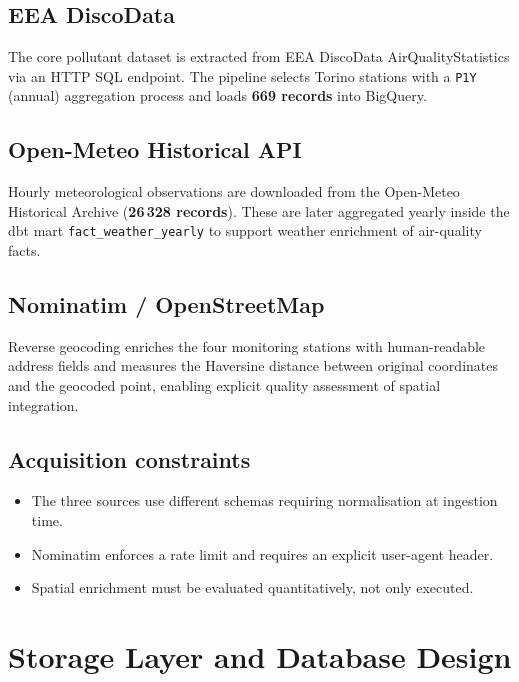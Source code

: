 \documentclass[11pt,a4paper]{article}
\begin{document}
\subsection{EEA DiscoData}

The core pollutant dataset is extracted from EEA DiscoData AirQualityStatistics via an HTTP SQL
endpoint. The pipeline selects Torino stations with a \texttt{P1Y} (annual) aggregation process
and loads \textbf{669 records} into BigQuery.

\subsection{Open-Meteo Historical API}

Hourly meteorological observations are downloaded from the Open-Meteo Historical Archive
(\textbf{26\,328 records}). These are later aggregated yearly inside the dbt mart
\texttt{fact\_weather\_yearly} to support weather enrichment of air-quality facts.

\subsection{Nominatim / OpenStreetMap}

Reverse geocoding enriches the four monitoring stations with human-readable address fields and
measures the Haversine distance between original coordinates and the geocoded point, enabling
explicit quality assessment of spatial integration.

\subsection{Acquisition constraints}

\begin{itemize}
  \item The three sources use different schemas requiring normalisation at ingestion time.
  \item Nominatim enforces a rate limit and requires an explicit user-agent header.
  \item Spatial enrichment must be evaluated quantitatively, not only executed.
\end{itemize}

\section{Storage Layer and Database Design}
\end{document}
